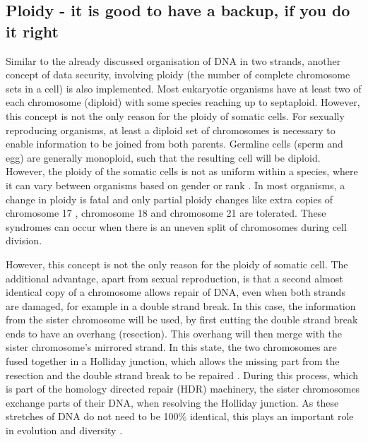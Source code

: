 \subsection[Ploidy]{Ploidy - it is good to have a backup, if you do it right}
\label{intro-sec:ploidy}
Similar to the already discussed organisation of DNA in two strands, another concept of data security, involving ploidy (the number of complete chromosome sets in a cell) is also implemented. Most eukaryotic organisms have at least two of each chromosome (diploid) with some species reaching up to septaploid\cite{Tateoka1975}. However, this concept is not the only reason for the ploidy of somatic cells. For sexually reproducing organisms, at least a diploid set of chromosomes is necessary to enable information to be joined from both parents. Germline cells (sperm and egg) are generally monoploid, such that the resulting cell will be diploid. However, the ploidy of the somatic cells is not as uniform within a species, where it can vary between organisms based on gender or rank \cite{Trivers1976}. 
In most organisms, a change in ploidy is fatal \cite{Otto2007} and only partial ploidy changes like extra copies of chromosome 17 \cite{Gottlieb1962}, chromosome 18 \cite{Cereda2012} and chromosome 21 \cite{Hulten2008} are tolerated. These syndromes can occur when there is an uneven split of chromosomes during cell division.

However, this concept is not the only reason for the ploidy of somatic cell. The additional advantage, apart from sexual reproduction, is that a second almost identical copy of a chromosome allows repair of DNA, even when both strands are damaged, for example in a double strand break.
In this case, the information from the sister chromosome will be used, by first cutting the double strand break ends to have an overhang (resection). This overhang will then merge with the sister chromosome's mirrored strand. In this state, the two chromosomes are fused together in a Holliday junction, which allows the missing part from the resection and the double strand break to be repaired \cite{Lilley2000}. During this process, which is part of the homology directed repair (HDR) machinery, the sister chromosomes exchange parts of their DNA, when resolving the Holliday junction. As these stretches of DNA do not need to be 100\% identical, this plays an important role in evolution and diversity \cite{Hanage2006,Kong2013}.


